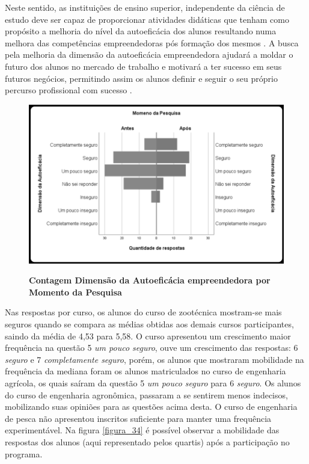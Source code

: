 Neste sentido, as instituições de ensino superior, independente da ciência de estudo deve ser capaz de proporcionar atividades didáticas que tenham como propósito a melhoria do nível da autoeficácia dos alunos resultando numa melhora das competências empreendedoras  pós formação dos mesmos \cite{ribeiro_autoeficacia_2019}. A busca pela melhoria da dimensão da autoeficácia empreendedora ajudará a moldar o futuro dos alunos no mercado de trabalho e motivará a ter sucesso em seus futuros negócios, permitindo assim os alunos  definir e seguir o seu próprio percurso profissional com sucesso  \cite{das_examining_2018}.

\begin{figure}[H]
\centering
\caption{\textbf{
Contagem Dimensão da Autoeficácia empreendedora  por Momento da Pesquisa}}
\includegraphics[scale=0.4]{Imagens/histograma_autoeficacia_antes.png}
\label{figura_29}
\end{figure}


Nas respostas por curso, os alunos do curso de zootécnica mostram-se mais seguros quando se compara as médias obtidas aos demais cursos participantes, saindo da média de 4,53 para 5,58. O curso apresentou um crescimento maior frequência na questão 5 \textit{um pouco seguro}, ouve um crescimento das respostas: 6 \textit{seguro} e 7 \textit{completamente seguro}, porém, os alunos que mostraram mobilidade na frequência da mediana foram os alunos matriculados no curso de engenharia agrícola, os quais saíram da questão 5 \textit{um pouco seguro} para 6 \textit{seguro}. Os alunos do curso de engenharia agronômica, passaram a se sentirem menos indecisos, mobilizando suas opiniões para as questões acima desta. O curso de engenharia de pesca não apresentou inscritos suficiente para manter uma frequência experimentável. Na figura \ref{figura_34} é possível observar a mobilidade das respostas dos alunos (aqui representado pelos quartis) após a participação no programa.


